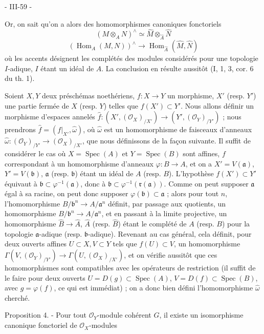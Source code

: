 - III-59 -

Or, on sait qu'on a alors des homomorphismes canoniques fonctoriels
$$(M \otimes_A N)^\wedge \simeq \hat{M} \otimes_{\hat{A}} \hat{N}$$
$$(\operatorname{Hom}_A(M, N))^\wedge \to \operatorname{Hom}_{\hat{A}}(\hat{M}, \hat{N})$$
où les accents désignent les complétés des modules considérés pour une topologie $I$-adique, $I$ étant un idéal de $A$. La conclusion en résulte aussitôt (I, 1, 3, cor. 6 du th. 1).

Soient $X, Y$ deux préschémas noethériens, $f: X \to Y$ un morphisme, $X'$ (resp. $Y'$) une partie fermée de $X$ (resp. $Y$) telles que $f(X') \subset Y'$. Nous allons définir un morphisme d'espaces annelés $\hat{f}: (X', (\mathcal{O}_X)_{/X'}) \to (Y', (\mathcal{O}_Y)_{/Y'})$ ; nous prendrons $\hat{f} = (f|_{X'}, \hat{\omega})$, où $\hat{\omega}$ est un homomorphisme de faisceaux d'anneaux $\hat{\omega}: (\mathcal{O}_Y)_{/Y'} \to (\mathcal{O}_X)_{/X'}$, que nous définissons de la façon suivante. Il suffit de considérer le cas où $X=\operatorname{Spec}(A)$ et $Y=\operatorname{Spec}(B)$ sont affines, $f$ correspondant à un homomorphisme d'anneaux $\varphi: B \to A$, et on a $X'=V(\mathfrak{a})$, $Y'=V(\mathfrak{b})$, $\mathfrak{a}$ (resp. $\mathfrak{b}$) étant un idéal de $A$ (resp. $B$). L'hypothèse $f(X') \subset Y'$ équivaut à $\mathfrak{b} \subset \varphi^{-1}(\mathfrak{a})$, donc à $\mathfrak{b} \subset \varphi^{-1}(\mathfrak{r}(\mathfrak{a}))$. Comme on peut supposer $\mathfrak{a}$ égal à sa racine, on peut donc supposer $\varphi(\mathfrak{b}) \subset \mathfrak{a}$ ; alors pour tout $n$, l'homomorphisme $B/\mathfrak{b}^n \to A/\mathfrak{a}^n$ définit, par passage aux quotients, un homomorphisme $B/\mathfrak{b}^n \to A/\mathfrak{a}^n$, et en passant à la limite projective, un homomorphisme $\hat{B} \to \hat{A}$, $\hat{A}$ (resp. $\hat{B}$) étant le complété de $A$ (resp. $B$) pour la topologie $\mathfrak{a}$-adique (resp. $\mathfrak{b}$-adique). Revenant au cas général, cela définit, pour deux ouverts affines $U \subset X, V \subset Y$ tels que $f(U) \subset V$, un homomorphisme $\Gamma(V, (\mathcal{O}_Y)_{/Y'}) \to \Gamma(U, (\mathcal{O}_X)_{/X'})$, et on vérifie aussitôt que ces homomorphismes sont compatibles avec les opérateurs de restriction (il suffit de le faire pour deux ouverts $U=D(g) \subset \operatorname{Spec}(A)$, $V=D(f) \subset \operatorname{Spec}(B)$, avec $g=\varphi(f)$, ce qui est immédiat) ; on a donc bien défini l'homomorphisme $\hat{\omega}$ cherché.

Proposition 4. - Pour tout $\mathcal{O}_Y$-module cohérent $G$, il existe un isomorphisme canonique fonctoriel de $\mathcal{O}_X$-modules

